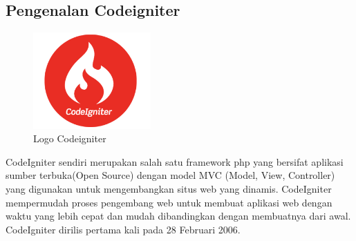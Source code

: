 \subsection{Pengenalan Codeigniter}
	\begin{figure}[H]
		\includegraphics[width=4.5cm]{figures/codeigniter.png}
		\centering
		\caption{Logo Codeigniter}
	\end{figure}
CodeIgniter sendiri merupakan salah satu framework php yang bersifat aplikasi sumber terbuka(Open Source) dengan model MVC (Model, View, Controller) yang digunakan untuk mengembangkan situs web yang dinamis. CodeIgniter mempermudah proses pengembang web untuk membuat aplikasi web dengan waktu yang lebih cepat dan mudah dibandingkan dengan membuatnya dari awal. CodeIgniter dirilis pertama kali pada 28 Februari 2006. 

